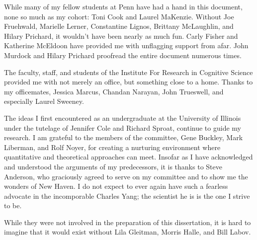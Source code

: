 While many of my fellow students at Penn have had a hand in this document, none so much as my cohort: Toni Cook and Laurel MaKenzie. Without Joe Fruehwald, Marielle Lerner, Constantine Lignos, Brittany McLaughlin, and Hilary Prichard, it wouldn't have been nearly as much fun. Carly Fisher and Katherine McEldoon have provided me with unflagging support from afar. John Murdock and Hilary Prichard proofread the entire document numerous times.

The faculty, staff, and students of the Institute For Research in Cognitive Science provided me with not merely an office, but something close to a home. Thanks to my officemates, Jessica Marcus, Chandan Narayan, John Trueswell, and especially Laurel Sweeney.

The ideas I first encountered as an undergraduate at the University of Illinois under the tutelage of Jennifer Cole and Richard Sproat, continue to guide my research. I am grateful to the members of the committee, Gene Buckley, Mark Liberman, and Rolf Noyer, for creating a nurturing environment where quantitative and theoretical approaches can meet. Insofar as I have acknowledged and understood the arguments of my predecessors, it is thanks to Steve Anderson, who graciously agreed to serve on my committee and to show me the wonders of New Haven. 
I do not expect to ever again have such a fearless advocate in the incomporable Charles Yang; the scientist he is is the one I strive to be.

While they were not involved in the preparation of this dissertation, it is hard to imagine that it would exist without Lila Gleitman, Morris Halle, and Bill Labov. 
